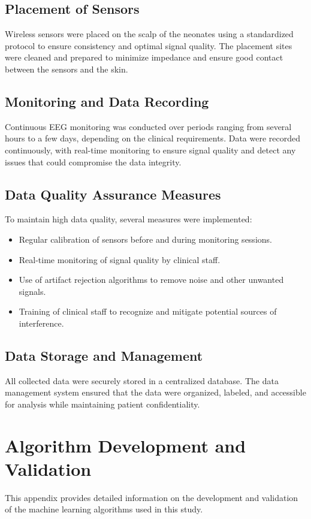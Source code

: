 \documentclass[12pt,journal,compsoc]{IEEEtran}
\begin{document}
\subsection{Placement of Sensors}
Wireless sensors were placed on the scalp of the neonates using a standardized protocol to ensure consistency and optimal signal quality. The placement sites were cleaned and prepared to minimize impedance and ensure good contact between the sensors and the skin.

\subsection{Monitoring and Data Recording}
Continuous EEG monitoring was conducted over periods ranging from several hours to a few days, depending on the clinical requirements. Data were recorded continuously, with real-time monitoring to ensure signal quality and detect any issues that could compromise the data integrity.

\subsection{Data Quality Assurance Measures}
To maintain high data quality, several measures were implemented:
\begin{itemize}
    \item Regular calibration of sensors before and during monitoring sessions.
    \item Real-time monitoring of signal quality by clinical staff.
    \item Use of artifact rejection algorithms to remove noise and other unwanted signals.
    \item Training of clinical staff to recognize and mitigate potential sources of interference.
\end{itemize}

\subsection{Data Storage and Management}
All collected data were securely stored in a centralized database. The data management system ensured that the data were organized, labeled, and accessible for analysis while maintaining patient confidentiality.

\section{Algorithm Development and Validation}
This appendix provides detailed information on the development and validation of the machine learning algorithms used in this study.
\end{document}
